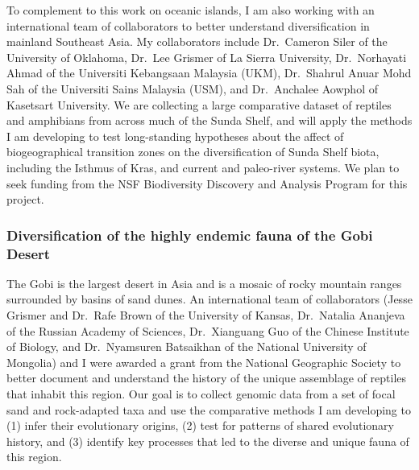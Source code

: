 To complement to this work on oceanic islands, I am also working with an
international team of collaborators to better understand diversification in
mainland Southeast Asia.
My collaborators include
Dr.\ Cameron Siler of the University of Oklahoma,
Dr.\ Lee Grismer of La Sierra University,
Dr.\ Norhayati Ahmad of the Universiti
Kebangsaan Malaysia (UKM),
Dr.\ Shahrul Anuar Mohd Sah of the Universiti Sains Malaysia (USM),
and
Dr.\ Anchalee Aowphol of Kasetsart University.
We are collecting a large comparative dataset of reptiles and amphibians from
across much of the Sunda Shelf, and will apply the
methods I am developing to test long-standing hypotheses about the affect of
biogeographical transition zones on the diversification of Sunda Shelf biota,
including the Isthmus of Kras, and current and paleo-river systems.
We plan to seek funding from the NSF Biodiversity Discovery and Analysis
Program for this project.

\subsubsection*{Diversification of the highly endemic fauna of the Gobi Desert}
The Gobi is the largest desert in Asia and is a mosaic of rocky mountain ranges
surrounded by basins of sand dunes.
An international team of collaborators (Jesse Grismer and Dr.\ Rafe Brown of
the University of Kansas, Dr.\ Natalia Ananjeva of the Russian Academy of
Sciences, Dr.\ Xianguang Guo of the Chinese Institute of Biology, and Dr.\
Nyamsuren Batsaikhan of the National University of Mongolia) and I were awarded
a grant from the National Geographic Society to better document and understand
the history of the unique assemblage of reptiles that inhabit this region.
Our goal is to collect genomic data from a set of focal sand and rock-adapted
taxa and use the comparative methods I am developing to
(1) infer their evolutionary origins,
(2) test for patterns of shared evolutionary history, and
(3) identify key processes that led to the diverse and unique fauna of this
region.

